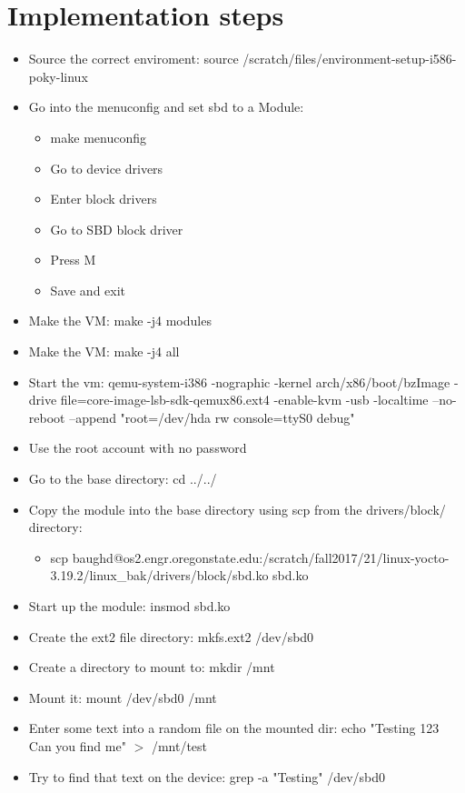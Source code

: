 \documentclass[10pt,drafclsnofoot,onecolumn]{IEEEtran}
\begin{document}
\section{Implementation steps}
\begin{itemize}
\item Source the correct enviroment: source /scratch/files/environment-setup-i586-poky-linux
\item Go into the menuconfig and set sbd to a Module:
	\begin{itemize}
	\item make menuconfig
	\item Go to device drivers
	\item Enter block drivers
	\item Go to SBD block driver
	\item Press M
	\item Save and exit
	\end{itemize}
\item Make the VM: make -j4 modules
\item Make the VM: make -j4 all
\item Start the vm: qemu-system-i386 -nographic -kernel arch/x86/boot/bzImage -drive file=core-image-lsb-sdk-qemux86.ext4 -enable-kvm -usb -localtime --no-reboot --append "root=/dev/hda rw console=ttyS0 debug"
\item Use the root account with no password
\item Go to the base directory: cd ../../
\item Copy the module into the base directory using scp from the drivers/block/ directory: 
	\begin{itemize}
	\item scp baughd@os2.engr.oregonstate.edu:/scratch/fall2017/21/linux-yocto-3.19.2/linux\_bak/drivers/block/sbd.ko sbd.ko
	\end{itemize}
\item Start up the module: insmod sbd.ko
\item Create the ext2 file directory: mkfs.ext2 /dev/sbd0
\item Create a directory to mount to: mkdir /mnt
\item Mount it: mount /dev/sbd0 /mnt
\item Enter some text into a random file on the mounted dir: echo "Testing 123 Can you find me" $>$ /mnt/test
\item Try to find that text on the device: grep -a "Testing" /dev/sbd0
\end{itemize}
\end{document}
